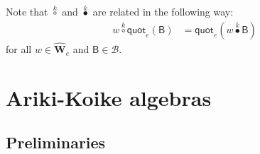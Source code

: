 \documentclass[11pt,a4paper,reqno]{amsart}
\numberwithin{equation}{section}
\theoremstyle{plain}
\newtheorem{lem}[thm]{Lemma}
\theoremstyle{definition}
\theoremstyle{remark}
\numberwithin{equation}{section}
\newcommand{\bl}{\boldsymbol{\lambda}}
\newcommand{\bm}{\boldsymbol{\mu}}
\newcommand{\fs}{\mathcal{s}}
\newcommand{\bfs}{\pmb{\fs}}
\newcommand{\bt}{\mathbf{t}}
\newcommand{\bu}{\mathbf{u}}
\newcommand{\quot}{\mathsf{quot}}
\newcommand{\ZZ}{\mathbb{Z}}
\newcommand{\BB}{\mathcal{B}}
\newcommand{\B}{\mathsf{B}}
\newcommand{\PP}{\mathcal{P}}
\newcommand{\EW}{\widehat{\mathbf{W}}}
\newcommand{\AW}{\mathbf{W}}
\newcommand{\sym}[1]{\mathfrak{S}_{#1}}
\newcommand{\DDot}[1]{\mathrel{\overset{#1}{\bullet}}}
\newcommand{\CDot}[1]{\mathrel{\overset{#1}{\circ}}}
\begin{document}
Note that $\CDot{k}$ and $\DDot{k}$ are related in the following way:
\begin{align}
w \CDot{k} \quot_e(\B) &= \quot_e( w \DDot{k} \B) \label{E:CDot-tuple-beta-sets}%
\end{align}
for all $w \in \EW_e$ and $\B \in \BB$. %








\section{Ariki-Koike algebras} \label{S:main}

\subsection{Preliminaries}
\end{document}
